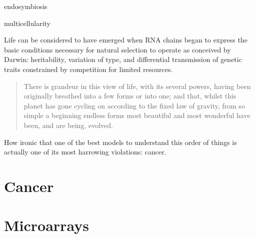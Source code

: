 \documentclass{tufte-book}
\begin{document}
endosymbiosis

multicellularity


Life can be considered to have emerged when RNA chains began to express the
basic conditions necessary for natural selection to operate as conceived by
Darwin: heritability, variation of type, and differential transmission of
genetic traits constrained by competition for limited resources.

\begin{quotation}
  There is grandeur in this view of life, with its several powers, having been
  originally breathed into a few forms or into one; and that, whilst this planet
  has gone cycling on according to the fixed law of gravity, from so simple a
  beginning endless forms most beautiful and most wonderful have been, and are
  being, evolved.
\end{quotation}

How ironic that one of the best models to understand this order of things is
actually one of its most harrowing violations: cancer.\bigskip

\section{Cancer}

\bigskip

\section{Microarrays}

\backmatter



% 
% 
\end{document}
